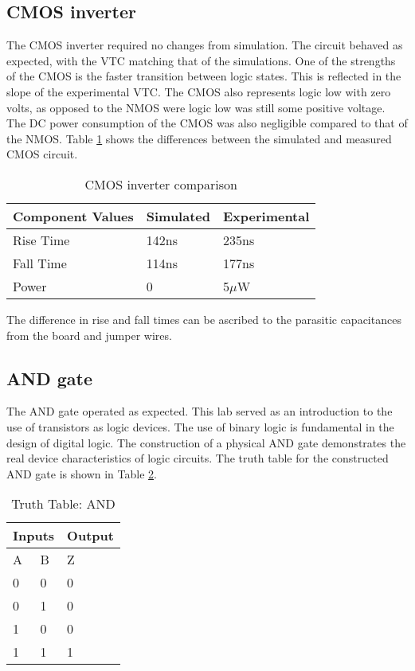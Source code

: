 \subsection{CMOS inverter}
The CMOS inverter required no changes from simulation. The circuit behaved as expected, with the VTC matching that of the simulations. One of the strengths of the CMOS is the faster transition between logic states. This is reflected in the slope of the experimental VTC. The CMOS also represents logic low with zero volts, as opposed to the NMOS were logic low was still some positive voltage. The DC power consumption of the CMOS was also negligible compared to that of the NMOS. Table \ref{tab:cmosexpvsim} shows the differences between the simulated and measured CMOS circuit.

\begin{table}[H]
	\centering
	\caption{CMOS inverter comparison}
	\label{tab:cmosexpvsim}
	\begin{tabular}{|l|l|l|}
		\hline
		Component Values & Simulated & Experimental \\ \hline
		Rise Time        & 142ns     & 235ns        \\ \hline
		Fall Time        & 114ns     & 177ns        \\ \hline
		Power            & 0         & 5$\mu$W      \\ \hline
	\end{tabular}
\end{table}

The difference in rise and fall times can be ascribed to the parasitic capacitances from the board and jumper wires. 

\subsection{AND gate}
The AND gate operated as expected. This lab served as an introduction to the use of transistors as logic devices. The use of binary logic is fundamental in the design of digital logic. The construction of a physical AND gate demonstrates the real device characteristics of logic circuits. The truth table for the constructed AND gate is shown in Table \ref{tab:truthANDdis}.

\begin{table}[H]
\centering
\caption{Truth Table: AND}
\label{tab:truthANDdis}
\begin{tabular}{|l|l|l|}
\hline
\multicolumn{2}{|l|}{Inputs} & Output \\ \hline
A             & B            & Z      \\ \hline
0             & 0            & 0      \\ \hline
0             & 1            & 0      \\ \hline
1             & 0            & 0      \\ \hline
1             & 1            & 1      \\ \hline
\end{tabular}
\end{table}

